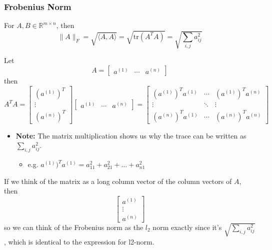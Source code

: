 \subsubsection{Frobenius Norm}
\begin{definition}
    For $A, B \in \mathbb{R}^{m \times n}$, then 
    \begin{equation}
        \| A \|_F = \sqrt{\langle A, A \rangle} = \sqrt{\text{tr}(A^T A)} = \sqrt{\sum_{i,j} a_{ij}^2}
    \end{equation}
\end{definition}

\begin{intuition}
    Let
    \[
    A = \begin{bmatrix} 
    a^{(1)} & \cdots & a^{(n)} 
    \end{bmatrix}
    \]
    then
    \[
    A^T A = \begin{bmatrix} 
    (a^{(1)})^T \\ \vdots \\ (a^{(n)})^T 
    \end{bmatrix} 
    \begin{bmatrix} 
    a^{(1)} & \cdots & a^{(n)} 
    \end{bmatrix}
    = 
    \begin{bmatrix} 
    (a^{(1)})^T a^{(1)} & \cdots & (a^{(1)})^T a^{(n)} \\
    \vdots & \ddots & \vdots \\
    (a^{(n)})^T a^{(1)} & \cdots & (a^{(n)})^T a^{(n)} 
    \end{bmatrix}
    \]
    \begin{itemize}
        \item \textbf{Note:} The matrix multiplication shows us why the trace can be written as $\sum_{i,j} a_{ij}^2$. 
        \begin{itemize}
            \item e.g. $a^{(1)})^T a^{(1)} = a_{11}^2 + a_{21}^2 + \ldots + a_{n1}^2$
        \end{itemize}
    \end{itemize}
    \vspace{1em}

    If we think of the matrix as a long column vector of the column vectors of $A$, then 
    \[
    \begin{bmatrix}
    a^{(1)} \\
    \vdots \\
    a^{(n)}
    \end{bmatrix}
    \]
    so we can think of the Frobenius norm as the $l_2$ norm exactly since it's $\sqrt{\sum_{i,j} a_{ij}^2}$, which is identical to the expression for l2-norm.
\end{intuition}

